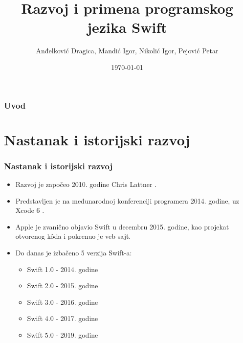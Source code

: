 \documentclass{beamer}
\title[]{Razvoj i primena programskog jezika Swift} %
\author[]{Anđelković Dragica, Mandić Igor, Nikolić Igor, Pejović  Petar} %
\institute[Matf] %
{
Matematički fakultet \\ %
\medskip
\textit{andjelkovic.dragica96@gmail.com, igormandic996@gmail.com, \\ igor.nikolic032@hotmail.com, petar.pejovic8@gmail.com} %
}
\date{\today} %
\begin{document}
\begin{frame}
\titlepage %
\end{frame}

\begin{frame}
\frametitle{Uvod} %
\tableofcontents %

\end{frame}


\section{Nastanak i istorijski razvoj}
\begin{frame}
\frametitle{Nastanak i istorijski razvoj}

\begin{itemize}
\item  Razvoj je započeo 2010. godine Chris Lattner \cite{mastering_swift3}.
\item  Predstavljen je na međunarodnoj konferenciji programera 2014. godine, uz  Xcode 6 \cite{thenextweb_sajt}.
\item Apple je zvanično objavio Swift u decembru 2015. godine, kao projekat otvorenog k\^{o}da i pokrenuo je veb sajt.
\item Do danas je izbačeno 5 verzija Swift-a:
\begin{itemize}
\item{Swift 1.0} - 2014. godine
\item{Swift 2.0} - 2015. godine
\item{Swift 3.0} - 2016. godine
\item{Swift 4.0} - 2017. godine
\item{Swift 5.0} - 2019. godine
\end{itemize}
\end{itemize}
\end{frame}
\end{document}
